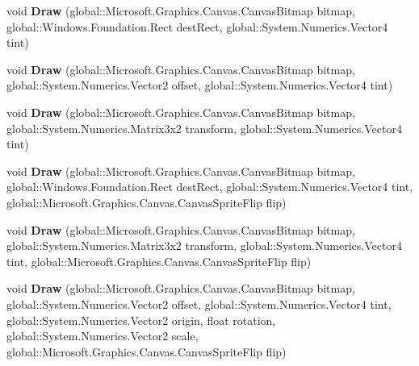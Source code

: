 \begin{DoxyCompactItemize}
void {\bfseries Draw} (global\+::\+Microsoft.\+Graphics.\+Canvas.\+Canvas\+Bitmap bitmap, global\+::\+Windows.\+Foundation.\+Rect dest\+Rect, global\+::\+System.\+Numerics.\+Vector4 tint)
\item 
\mbox{\label{class_microsoft_1_1_graphics_1_1_canvas_1_1_canvas_sprite_batch_af83f6d164806efe2c3b5584aacf35266}} 
void {\bfseries Draw} (global\+::\+Microsoft.\+Graphics.\+Canvas.\+Canvas\+Bitmap bitmap, global\+::\+System.\+Numerics.\+Vector2 offset, global\+::\+System.\+Numerics.\+Vector4 tint)
\item 
\mbox{\label{class_microsoft_1_1_graphics_1_1_canvas_1_1_canvas_sprite_batch_a37f363ad9485bacdf1870d5fcac66390}} 
void {\bfseries Draw} (global\+::\+Microsoft.\+Graphics.\+Canvas.\+Canvas\+Bitmap bitmap, global\+::\+System.\+Numerics.\+Matrix3x2 transform, global\+::\+System.\+Numerics.\+Vector4 tint)
\item 
\mbox{\label{class_microsoft_1_1_graphics_1_1_canvas_1_1_canvas_sprite_batch_a539c34e4dd073937d6e282aff3ac5fa3}} 
void {\bfseries Draw} (global\+::\+Microsoft.\+Graphics.\+Canvas.\+Canvas\+Bitmap bitmap, global\+::\+Windows.\+Foundation.\+Rect dest\+Rect, global\+::\+System.\+Numerics.\+Vector4 tint, global\+::\+Microsoft.\+Graphics.\+Canvas.\+Canvas\+Sprite\+Flip flip)
\item 
\mbox{\label{class_microsoft_1_1_graphics_1_1_canvas_1_1_canvas_sprite_batch_a6ce7fa9de20ecdd859df4d33baa22b96}} 
void {\bfseries Draw} (global\+::\+Microsoft.\+Graphics.\+Canvas.\+Canvas\+Bitmap bitmap, global\+::\+System.\+Numerics.\+Matrix3x2 transform, global\+::\+System.\+Numerics.\+Vector4 tint, global\+::\+Microsoft.\+Graphics.\+Canvas.\+Canvas\+Sprite\+Flip flip)
\item 
\mbox{\label{class_microsoft_1_1_graphics_1_1_canvas_1_1_canvas_sprite_batch_ad594e0d83883455fdc71585e3b4b4b46}} 
void {\bfseries Draw} (global\+::\+Microsoft.\+Graphics.\+Canvas.\+Canvas\+Bitmap bitmap, global\+::\+System.\+Numerics.\+Vector2 offset, global\+::\+System.\+Numerics.\+Vector4 tint, global\+::\+System.\+Numerics.\+Vector2 origin, float rotation, global\+::\+System.\+Numerics.\+Vector2 scale, global\+::\+Microsoft.\+Graphics.\+Canvas.\+Canvas\+Sprite\+Flip flip)

\end{DoxyCompactItemize}
